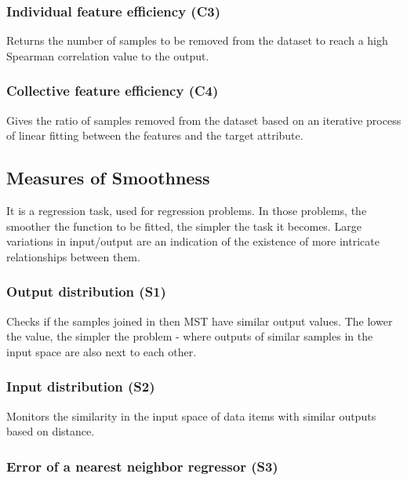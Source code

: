 \subsubsection{Individual feature efficiency (C3)}

Returns the number of samples to be removed from the dataset to reach a high 
Spearman correlation value to the output.

\subsubsection{Collective feature efficiency (C4)}

Gives the ratio of samples removed from the dataset based on an iterative 
process of linear fitting between the features and the target attribute.

\subsection{Measures of Smoothness}\label{sec:smoothness}

It is a regression task, used for regression problems. In those problems, the 
smoother the function to be fitted, the simpler the task it becomes. Large 
variations in input/output are an indication of the existence of more intricate
relationships between them.

\subsubsection{Output distribution (S1)}

Checks if the samples joined in then MST have similar output values. The lower
the value, the simpler the problem - where outputs of similar samples in the 
input space are also next to each other.

\subsubsection{Input distribution (S2)}

Monitors the similarity in the input space of data items with similar outputs
based on distance.

\subsubsection{Error of a nearest neighbor regressor (S3)}

